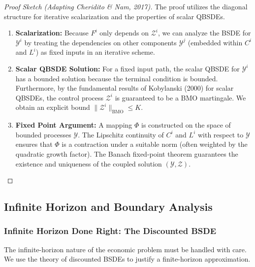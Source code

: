 \begin{proof}[Proof Sketch (Adapting Cheridito \& Nam, 2017)]
The proof utilizes the diagonal structure for iterative scalarization and the properties of scalar QBSDEs.
\begin{enumerate}
    \item \textbf{Scalarization:} Because $F^i$ only depends on $\mathcal{Z}^i$, we can analyze the BSDE for $\mathcal{Y}^i$ by treating the dependencies on other components $\mathcal{Y}^j$ (embedded within $C^i$ and $L^i$) as fixed inputs in an iterative scheme.
    \item \textbf{Scalar QBSDE Solution:} For a fixed input path, the scalar QBSDE for $\mathcal{Y}^i$ has a bounded solution because the terminal condition is bounded. Furthermore, by the fundamental results of Kobylanski (2000) \cite{Kobylanski2000} for scalar QBSDEs, the control process $\mathcal{Z}^i$ is guaranteed to be a BMO martingale. We obtain an explicit bound $\|\mathcal{Z}^i\|_{\mathrm{BMO}} \le K$.
    \item \textbf{Fixed Point Argument:} A mapping $\Phi$ is constructed on the space of bounded processes $\mathcal{Y}$. The Lipschitz continuity of $C^i$ and $L^i$ with respect to $\mathcal{Y}$ ensures that $\Phi$ is a contraction under a suitable norm (often weighted by the quadratic growth factor). The Banach fixed-point theorem guarantees the existence and uniqueness of the coupled solution $(\mathcal{Y}, \mathcal{Z})$.
\end{enumerate}
\end{proof}

\subsection{Infinite Horizon and Boundary Analysis}
\label{subsec:GE_infinite_horizon}

\subsubsection{Infinite Horizon Done Right: The Discounted BSDE}
The infinite-horizon nature of the economic problem must be handled with care. We use the theory of discounted BSDEs to justify a finite-horizon approximation.

